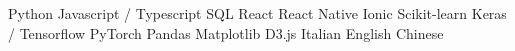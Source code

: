 
\skilltabular
{                  {Python}        {Javascript / Typescript}     {SQL}         {}  }
{      {React}         {React Native}                {Ionic}       {}  }
{           {Scikit-learn}  {Keras / Tensorflow}          {PyTorch}     {}  }
{   {Pandas}        {Matplotlib}                  {D3.js}       {}  }
{              {Italian}       {English}                     {Chinese}     {}  }